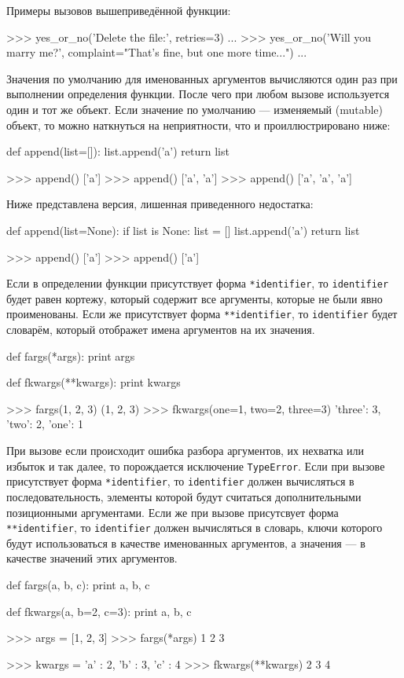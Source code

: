 Примеры вызовов вышеприведённой функции:
\begin{pylst}{}{}
>>> yes_or_no('Delete the file:', retries=3)
...
>>> yes_or_no('Will you marry me?',
              complaint="That's fine, but one more time...")
...
\end{pylst}

Значения по умолчанию для именованных аргументов вычисляются один раз при выполнении определения функции. После чего при любом вызове используется один и тот же объект. Если значение по умолчанию --- изменяемый (mutable) объект, то можно наткнуться на неприятности, что и проиллюстрировано ниже:
\begin{pylst}{}{}
def append(list=[]):
    list.append('a')
    return list

>>> append()
['a']
>>> append()
['a', 'a']
>>> append()
['a', 'a', 'a']
\end{pylst}

Ниже представлена версия, лишенная приведенного недостатка:
\begin{pylst}{}{}
def append(list=None):
    if list is None:
        list = []
    list.append('a')
    return list

>>> append()
['a']
>>> append()
['a']
\end{pylst}

Если в определении функции присутствует форма \lstinline{*identifier}, то \lstinline{identifier} будет равен кортежу, который содержит все аргументы, которые не были явно проименованы. Если же присутствует форма \lstinline{**identifier}, то \lstinline{identifier} будет словарём, который отображет имена аргументов на их значения.
\begin{pylst}{}{}
def fargs(*args):
    print args

def fkwargs(**kwargs):
    print kwargs

>>> fargs(1, 2, 3)
(1, 2, 3)
>>> fkwargs(one=1, two=2, three=3)
{'three': 3, 'two': 2, 'one': 1}
\end{pylst}

При вызове если происходит ошибка разбора аргументов, их нехватка или избыток и так далее, то порождается исключение \lstinline{TypeError}. Если при вызове присутствует форма \lstinline{*identifier}, то \lstinline{identifier} должен вычисляться в последовательность, элементы которой будут считаться дополнительными позиционными аргументами. Если же при вызове присутсвует форма \lstinline{**identifier}, то \lstinline{identifier} должен вычисляться в словарь, ключи которого будут использоваться в качестве именованных аргументов, а значения — в качестве значений этих аргументов.
\begin{pylst}{}{}
def fargs(a, b, c):
    print a, b, c

def fkwargs(a, b=2, c=3):
    print a, b, c

>>> args = [1, 2, 3]
>>> fargs(*args)
1 2 3

>>> kwargs = { 'a' : 2, 'b' : 3, 'c' : 4 }
>>> fkwargs(**kwargs)
2 3 4
\end{pylst}


